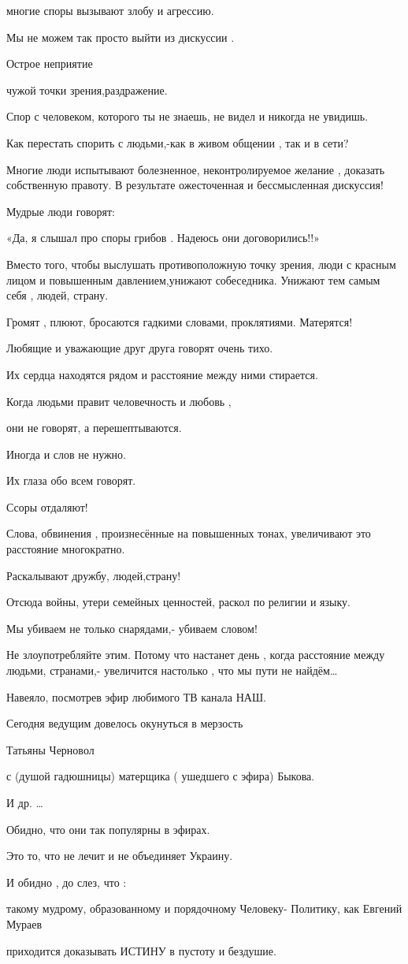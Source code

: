  многие споры вызывают злобу и агрессию. 

Мы не можем так просто выйти из дискуссии .

Острое неприятие 

чужой точки зрения,раздражение.

Спор с человеком, которого ты не знаешь, не видел и никогда не увидишь. 

Как перестать спорить с людьми,-как в живом общении , так и в сети?

Многие люди испытывают болезненное, неконтролируемое желание , доказать
собственную правоту. В результате ожесточенная и бессмысленная дискуссия!

Мудрые люди говорят:

«Да, я слышал про споры грибов . Надеюсь они договорились!!»

Вместо того, чтобы выслушать  противоположную  точку  зрения, люди с красным
лицом и повышенным давлением,унижают собеседника. Унижают тем самым себя ,
людей, страну.

Громят , плюют, бросаются гадкими словами, проклятиями.  Матерятся!

Любящие  и уважающие друг друга говорят очень тихо.

Их сердца находятся рядом  и расстояние между ними стирается. 

Когда людьми правит человечность и любовь , 

они не говорят, а перешептываются. 

Иногда и слов не нужно. 

Их глаза обо всем говорят.

Ссоры отдаляют! 

Слова, обвинения , произнесённые на повышенных тонах, увеличивают  это
расстояние многократно.  

Раскалывают дружбу,  людей,страну!

Отсюда войны, утери семейных ценностей, раскол по религии и языку. 

 Мы убиваем не только снарядами,- убиваем словом!

Не злоупотребляйте этим. Потому что настанет день , когда расстояние между
людьми, странами,- увеличится настолько , что мы пути не найдём…

Навеяло, посмотрев эфир любимого ТВ канала НАШ. 

Сегодня ведущим довелось окунуться в мерзость 

Татьяны  Черновол

с (душой гадюшницы) матерщика ( ушедшего с эфира) Быкова.

И др. … 

Обидно, что они так популярны в эфирах. 

Это то, что не лечит и не объединяет Украину. 

И  обидно , до слез, что :

такому мудрому, образованному  и порядочному Человеку- Политику, как Евгений
Мураев

 приходится доказывать ИСТИНУ в пустоту и бездушие.

